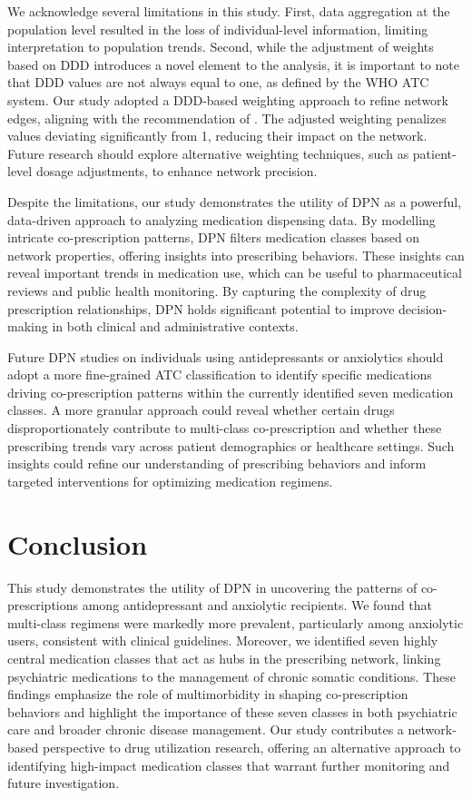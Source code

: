 \documentclass[
  authoryear,
  review]{elsarticle}
\begin{document}
We acknowledge several limitations in this study. First, data
aggregation at the population level resulted in the loss of
individual-level information, limiting interpretation to population
trends. Second, while the adjustment of weights based on DDD introduces
a novel element to the analysis, it is important to note that DDD values
are not always equal to one, as defined by the WHO ATC system. Our study
adopted a DDD-based weighting approach to refine network edges, aligning
with the recommendation of \citet{Cavallo2012}. The adjusted weighting
penalizes values deviating significantly from 1, reducing their impact
on the network. Future research should explore alternative weighting
techniques, such as patient-level dosage adjustments, to enhance network
precision.

Despite the limitations, our study demonstrates the utility of DPN as a
powerful, data-driven approach to analyzing medication dispensing data.
By modelling intricate co-prescription patterns, DPN filters medication
classes based on network properties, offering insights into prescribing
behaviors. These insights can reveal important trends in medication use,
which can be useful to pharmaceutical reviews and public health
monitoring. By capturing the complexity of drug prescription
relationships, DPN holds significant potential to improve
decision-making in both clinical and administrative contexts.

Future DPN studies on individuals using antidepressants or anxiolytics
should adopt a more fine-grained ATC classification to identify specific
medications driving co-prescription patterns within the currently
identified seven medication classes. A more granular approach could
reveal whether certain drugs disproportionately contribute to
multi-class co-prescription and whether these prescribing trends vary
across patient demographics or healthcare settings. Such insights could
refine our understanding of prescribing behaviors and inform targeted
interventions for optimizing medication regimens.

\section{Conclusion}\label{conclusion}

This study demonstrates the utility of DPN in uncovering the patterns of
co-prescriptions among antidepressant and anxiolytic recipients. We
found that multi-class regimens were markedly more prevalent,
particularly among anxiolytic users, consistent with clinical
guidelines. Moreover, we identified seven highly central medication
classes that act as hubs in the prescribing network, linking psychiatric
medications to the management of chronic somatic conditions. These
findings emphasize the role of multimorbidity in shaping co-prescription
behaviors and highlight the importance of these seven classes in both
psychiatric care and broader chronic disease management. Our study
contributes a network-based perspective to drug utilization research,
offering an alternative approach to identifying high-impact medication
classes that warrant further monitoring and future investigation.


\renewcommand\refname{References}
  
\end{document}
